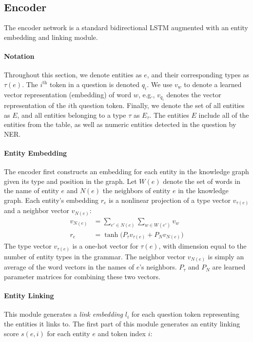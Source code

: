 \subsection{Encoder}\label{sec:nnsp_encoder}

The encoder network is a standard bidirectional LSTM augmented with an entity 
embedding and linking module.

\paragraph{Notation}
Throughout this section, we denote entities as $e$, and their corresponding 
types as $\tau(e)$. The $i^{\text{th}}$ token in a question is denoted $q_i$. 
We use $v_w$ to denote a learned vector representation (embedding) of word $w$, 
e.g., $v_{q_i}$ denotes the vector representation of the $i$th question token. 
Finally, we denote the set of all entities as $E$, and all entities belonging 
to a type $\tau$ as $E_{\tau}$. The entities $E$ include all of the entities 
from the table, as well as numeric entities detected in the question by NER. 

\paragraph{Entity Embedding}
The encoder first constructs an embedding for each entity in the knowledge 
graph given its type and position in the graph. 
Let $W(e)$ denote the set of words in the name of entity $e$ and $N(e)$ the 
neighbors of entity $e$ in the knowledge graph.
Each entity's embedding $r_e$ is a nonlinear projection of a type vector 
$v_{\tau(e)}$ and a neighbor vector $v_{N(e)}$:
\begin{align}
    v_{N(e)} &= \sum_{e' \in N(e)}\sum_{w \in W(e')}v_w \\
    r_e &= \tanh\big(P_\tau v_{\tau(e)} + P_N v_{N(e)}\big)
\end{align}
The type vector $v_{\tau(e)}$ is a one-hot vector for $\tau(e)$, with dimension 
equal to the number of entity types in the grammar. The neighbor vector 
$v_{N(e)}$ is simply an average of the word vectors in the names of $e$'s 
neighbors. $P_\tau$ and $P_N$ are learned parameter matrices for combining 
these two vectors.

\paragraph{Entity Linking}
This module generates a \emph{link embedding} $l_{i}$ for each question token 
representing the entities it links to.
The first part of this module generates an entity linking score $s(e,i)$ 
for each entity $e$ and token index $i$:

